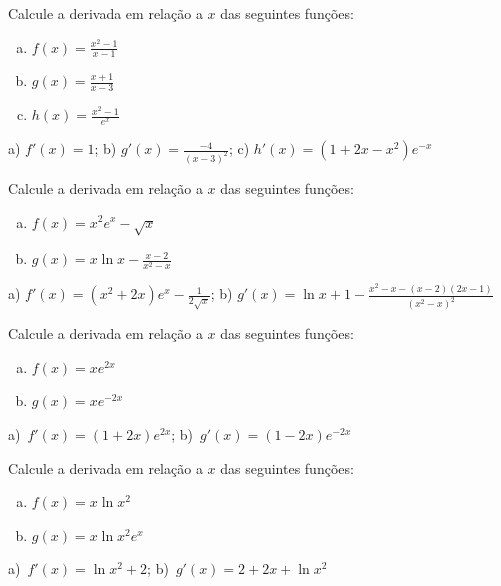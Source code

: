 \begin{exer}
  Calcule a derivada em relação a $x$ das seguintes funções:
  \begin{enumerate}[a)]
  \item $\displaystyle f(x) = \frac{x^2-1}{x-1}$
  \item $\displaystyle g(x) = \frac{x+1}{x-3}$
  \item $\displaystyle h(x) = \frac{x^2-1}{e^x}$
  \end{enumerate}
\end{exer}
\begin{resp}
  a) $\displaystyle f'(x) = 1$; b) $\displaystyle g'(x) = \frac{-4}{(x-3)^2}$; c) $\displaystyle h'(x) = (1+2x-x^2)e^{-x}$
\end{resp}

\begin{exer}
  Calcule a derivada em relação a $x$ das seguintes funções:
  \begin{enumerate}[a)]
  \item $\displaystyle f(x) = x^2e^x - \sqrt{x}$
  \item $\displaystyle g(x) = x\ln x - \frac{x-2}{x^2-x}$
  \end{enumerate}
\end{exer}
\begin{resp}
  a) $\displaystyle f'(x) = (x^2 + 2x)e^x - \frac{1}{2\sqrt{x}}$; b) $\displaystyle g'(x) = \ln x + 1 - \frac{x^2-x - (x-2)(2x-1)}{(x^2-x)^2}$
\end{resp}

\begin{exer}
  Calcule a derivada em relação a $x$ das seguintes funções:
  \begin{enumerate}[a)]
  \item $f(x) = xe^{2x}$
  \item $g(x) = xe^{-2x}$
  \end{enumerate}
\end{exer}
\begin{resp}
  a)~$f'(x) = (1+2x)e^{2x}$; b)~$g'(x) = (1-2x)e^{-2x}$
\end{resp}

\begin{exer}
  Calcule a derivada em relação a $x$ das seguintes funções:
  \begin{enumerate}[a)]
  \item $f(x) = x\ln x^2$
  \item $g(x) = x\ln x^2e^x$
  \end{enumerate}
\end{exer}
\begin{resp}
  a)~$f'(x) = \ln x^2 + 2$; b)~$g'(x) = 2+2x+\ln x^2$
\end{resp}

